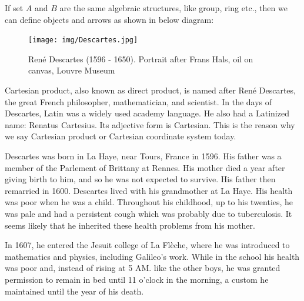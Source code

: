 \documentclass[b5paper]{article}
\begin{document}
If set $A$ and $B$ are the same algebraic structures, like group, ring etc., then we can define objects and arrows as shown in below diagram:

\begin{center}
\end{center}

\begin{figure}[htbp]
 \centering
 \texttt{[image: img/Descartes.jpg]}
 \captionsetup{labelformat=empty}
 \caption{René Descartes (1596 - 1650). Portrait after Frans Hals, oil on canvas, Louvre Museum}
 \label{fig:Decartes}
\end{figure}

 
Cartesian product, also known as direct product, is named after René Descartes, the great French philosopher, mathematician, and scientist. In the days of Descartes, Latin was a widely used academy language. He also had a Latinized name: Renatus Cartesius. Its adjective form is Cartesian. This is the reason why we say Cartesian product or Cartesian coordinate system today.

Descartes was born in La Haye, near Tours, France in 1596. His father was a member of the Parlement of Brittany at Rennes. His mother died a year after giving birth to him, and so he was not expected to survive. His father then remarried in 1600. Descartes lived with his grandmother at La Haye. His health was poor when he was a child. Throughout his childhood, up to his twenties, he was pale and had a persistent cough which was probably due to tuberculosis. It seems likely that he inherited these health problems from his mother.

In 1607, he entered the Jesuit college of La Flèche, where he was introduced to mathematics and physics, including Galileo's work. While in the school his health was poor and, instead of rising at 5 AM. like the other boys, he was granted permission to remain in bed until 11 o'clock in the morning, a custom he maintained until the year of his death.
\end{document}
